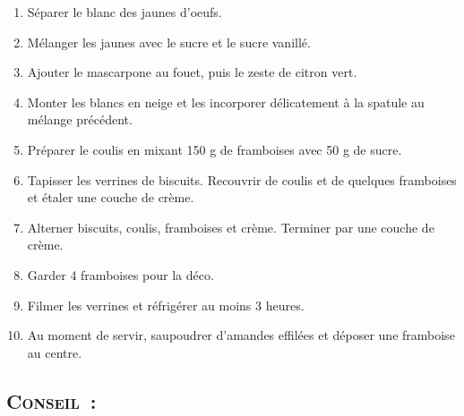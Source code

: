 \begin{enumerate}
\item S\'eparer le blanc des jaunes d’oeufs. 
\item M\'elanger les jaunes avec le sucre et le sucre vanill\'e. 
\item Ajouter le mascarpone au fouet, puis le zeste de citron vert. 
\item Monter les blancs en neige et les incorporer d\'elicatement \`a la spatule au m\'elange pr\'ec\'edent.
\item Pr\'eparer le coulis en mixant 150 g de framboises avec 50 g de sucre.
\item Tapisser les verrines de biscuits. Recouvrir de coulis et de quelques framboises et \'etaler une couche de cr\`eme.
\item Alterner biscuits, coulis, framboises et cr\`eme. Terminer par une couche de cr\`eme. 
\item Garder 4 framboises pour la d\'eco.
\item Filmer les verrines et r\'efrig\'erer au moins 3 heures.
\item Au moment de servir, saupoudrer d’amandes effil\'ees et d\'eposer une framboise au centre.
\end{enumerate}
\subsection*{\textsc{Conseil~:}}
